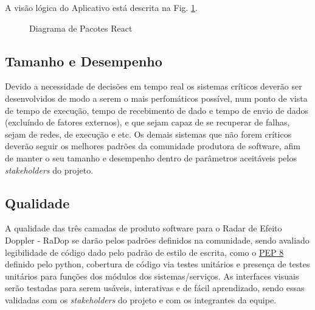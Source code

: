A visão lógica do Aplicativo está descrita na Fig. \ref{fig:diagrama-pact-react}.

\begin{figure}[!htb]
    \caption{\label{fig:diagrama-pact-react}Diagrama de Pacotes React}
\end{figure}
\pagebreak

\subsection{Tamanho e Desempenho}\label{tamanho-e-desempenho}

Devido a necessidade de decisões em tempo real os sistemas críticos
deverão ser desenvolvidos de modo a serem o mais perfomáticos possível,
num ponto de vista de tempo de execução, tempo de recebimento de dado e
tempo de envio de dados (excluíndo de fatores externos), e que sejam
capaz de se recuperar de falhas, sejam de redes, de execução e etc. Os
demais sistemas que não forem críticos deverão seguir os melhores
padrões da comunidade produtora de software, afim de manter o seu
tamanho e desempenho dentro de parâmetros aceitáveis pelos
\emph{stakeholders} do projeto.

\subsection{Qualidade}\label{qualidade}

A qualidade das três camadas de produto software para o Radar de Efeito
Doppler - RaDop se darão pelos padrões definidos na comunidade, sendo
avaliado legibilidade de código dado pelo padrão de estilo de escrita,
como o \href{https://www.python.org/dev/peps/pep-0008/}{PEP 8} definido
pelo python, cobertura de código via testes unitários e presença de
testes unitários para funções dos módulos dos sistemas/serviços. As
interfaces visuais serão testadas para serem usáveis, interativas e de
fácil aprendizado, sendo essas validadas com os \emph{stakeholders} do projeto e com os integrantes da equipe.
